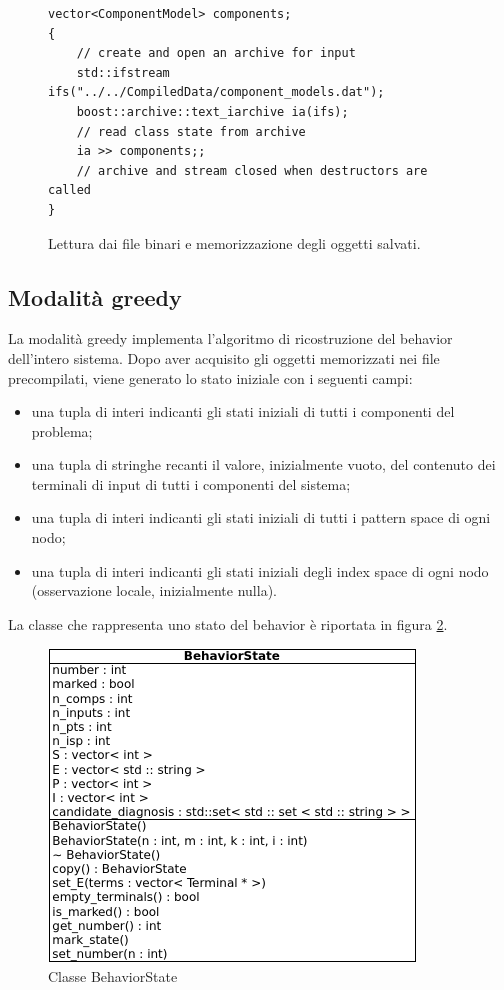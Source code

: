 \begin{figure}[htbp]
\begin{verbatim}
vector<ComponentModel> components;
{
    // create and open an archive for input
    std::ifstream ifs("../../CompiledData/component_models.dat");
    boost::archive::text_iarchive ia(ifs);
    // read class state from archive
    ia >> components;;
    // archive and stream closed when destructors are called
}
\end{verbatim}
\caption{Lettura dai file binari e memorizzazione degli oggetti salvati.}
\label{code:read_files}
\end{figure}

\subsection{Modalità greedy}
La modalità greedy implementa l'algoritmo di ricostruzione del behavior dell'intero sistema. Dopo aver acquisito gli oggetti memorizzati nei file precompilati, viene generato lo stato iniziale con i seguenti campi:
\begin{itemize}
\item una tupla di interi indicanti gli stati iniziali di tutti i componenti del problema;
\item una tupla di stringhe recanti il valore, inizialmente vuoto, del contenuto dei terminali di input di tutti i componenti del sistema;
\item una tupla di interi indicanti gli stati iniziali di tutti i pattern space di ogni nodo;
\item una tupla di interi indicanti gli stati iniziali degli index space di ogni nodo (osservazione locale, inizialmente nulla).
\end{itemize} 
La classe che rappresenta uno stato del behavior è riportata in figura \ref{fig:bhv_state}.

\begin{figure}[htbp]
\centering
\includegraphics[scale=0.7]{./Img/implementazione/bhv_state.png}
\caption{Classe BehaviorState}
\label{fig:bhv_state}
\end{figure}

